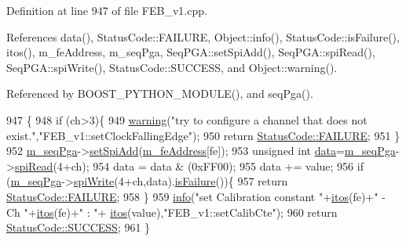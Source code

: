 Definition at line 947 of file F\+E\+B\+\_\+v1.\+cpp.



References data(), Status\+Code\+::\+F\+A\+I\+L\+U\+RE, Object\+::info(), Status\+Code\+::is\+Failure(), itos(), m\+\_\+fe\+Address, m\+\_\+seq\+Pga, Seq\+P\+G\+A\+::set\+Spi\+Add(), Seq\+P\+G\+A\+::spi\+Read(), Seq\+P\+G\+A\+::spi\+Write(), Status\+Code\+::\+S\+U\+C\+C\+E\+SS, and Object\+::warning().



Referenced by B\+O\+O\+S\+T\+\_\+\+P\+Y\+T\+H\+O\+N\+\_\+\+M\+O\+D\+U\+L\+E(), and seq\+Pga().


\begin{DoxyCode}
947                                                          \{
948   \textcolor{keywordflow}{if} (ch>3)\{
949     \hyperlink{classObject_a65cd4fda577711660821fd2cd5a3b4c9}{warning}(\textcolor{stringliteral}{"try to configure a channel that does not exist."},\textcolor{stringliteral}{"FEB\_v1::setClockFallingEdge"});
950     \textcolor{keywordflow}{return} \hyperlink{classStatusCode_a6f565cbeadc76d14c72f047e5e85eb4ba3da73d4c469762eb9d3c960368252b26}{StatusCode::FAILURE};
951   \}
952   \hyperlink{classFEB__v1_a6c7804ac86796f233a8393043adf2e77}{m\_seqPga}->\hyperlink{classSeqPGA_ac998ce3a6d9b5f2e88cc8393f8c1df53}{setSpiAdd}(\hyperlink{classFEB__v1_a4e1945c2d5b434125f375e9d0fc6d99f}{m\_feAddress}[fe]);
953   \textcolor{keywordtype}{unsigned} \textcolor{keywordtype}{int} \hyperlink{classFEB__v1_a6bca4320bd3bbbc32efc81097f33421a}{data}=\hyperlink{classFEB__v1_a6c7804ac86796f233a8393043adf2e77}{m\_seqPga}->\hyperlink{classSeqPGA_ab3d0e5e5d4014bc7a92588a76b8713d4}{spiRead}(4+ch);
954   data = data & (0xFF00);
955   data += value;
956   \textcolor{keywordflow}{if} (\hyperlink{classFEB__v1_a6c7804ac86796f233a8393043adf2e77}{m\_seqPga}->\hyperlink{classSeqPGA_ad4421841ce4ce8b88ad13f63216f0743}{spiWrite}(4+ch,data).\hyperlink{classStatusCode_a5dd22dc6eb2c52fc4cabc58f6dea2eb7}{isFailure}())\{
957     \textcolor{keywordflow}{return} \hyperlink{classStatusCode_a6f565cbeadc76d14c72f047e5e85eb4ba3da73d4c469762eb9d3c960368252b26}{StatusCode::FAILURE};
958   \}
959   \hyperlink{classObject_a644fd329ea4cb85f54fa6846484b84a8}{info}(\textcolor{stringliteral}{"set Calibration constant "}+\hyperlink{Tools_8h_af330027dbdafb9a30768b3613c553e60}{itos}(fe)+\textcolor{stringliteral}{" - Ch "}+\hyperlink{Tools_8h_af330027dbdafb9a30768b3613c553e60}{itos}(fe)+\textcolor{stringliteral}{" : "}+
      \hyperlink{Tools_8h_af330027dbdafb9a30768b3613c553e60}{itos}(value),\textcolor{stringliteral}{"FEB\_v1::setCalibCte"});
960   \textcolor{keywordflow}{return} \hyperlink{classStatusCode_a6f565cbeadc76d14c72f047e5e85eb4badd0da38d3ba0d922efd1f4619bc37ad8}{StatusCode::SUCCESS};
961 \}
\end{DoxyCode}
\mbox{\label{classFEB__v1_a9ccd318b9a80b1cbd554ec6fe461cd82}} 
